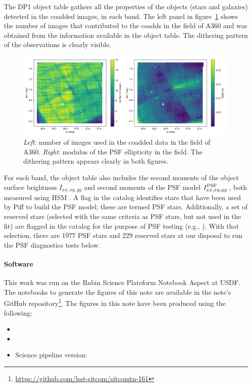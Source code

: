 \documentclass[SE,lsstdraft,authoryear,toc]{lsstdoc}
\begin{document}
The DP1 object table gathers all the properties of the objects (stars and galaxies) detected in the coadded images, in each band. The left panel in figure~\ref{fig:dither} shows the number of images that contributed to the coadds in the field of A360 and was obtained from the  information available in the object table. The dithering pattern of the observations is clearly visible.
\begin{figure}
\includegraphics[width=\textwidth]{Figures/psf_ellipticity_visits.png}
\caption{\emph{Left}: number of images used in the coadded data in the field of A360. \emph{Right}: modulus of the PSF ellipticity in the field. The dithering pattern appears clearly in both figures.\label{fig:dither}}
\end{figure}

For each band, the object table also includes the second moments of the object surface brightness $I_{xx,xy,yy}$ and second moments of the PSF model $I_{xx,xy,yy}^{\rm PSF}\,$, both measured using HSM \citep{2003MNRAS.343..459H, 2005MNRAS.361.1287M, 2018MNRAS.481.3170M}. A flag in the catalog identifies stars that have been used by Piff to build the PSF model; these are termed PSF stars. Additionally, a set of reserved stars (selected with the same criteria as PSF stars, but not used in the fit) are flagged in the catalog for the purpose of PSF testing (e.g., \citealp{2025OJAp....8E..26S}). 
With that selection, there are 1977 PSF stars and 229 reserved stars at our disposal to run the PSF diagnostics tests below. 

\paragraph*{Software} This work was run on the Rubin Science Plateform Notebook Aspect at USDF. The notebooks to generate the figures of this note are available in the note's GitHub repository\footnote{\url{https://github.com/lsst-sitcom/sitcomtn-161}}.
The figures in this note have been produced using the following:
\begin{itemize}
\item {}
\item {}
\item Science pipeline version: 
\end{itemize}
\end{document}
